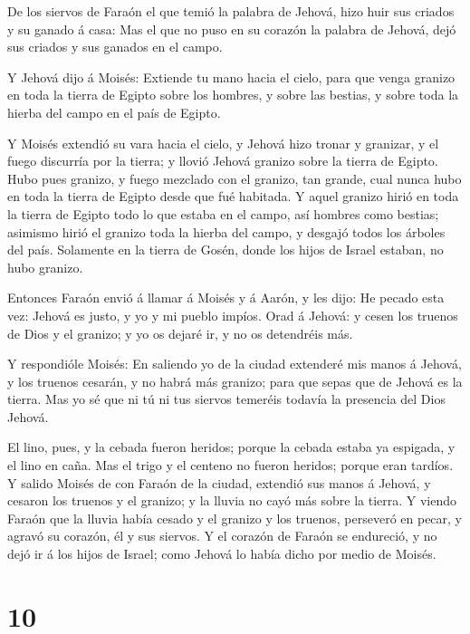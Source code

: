  De los siervos de Faraón el que temió la palabra de
Jehová, hizo huir sus criados y su ganado á casa:  Mas el
que no puso en su corazón la palabra de Jehová, dejó sus criados y sus
ganados en el campo.

 Y Jehová dijo á Moisés: Extiende tu mano hacia el cielo,
para que venga granizo en toda la tierra de Egipto sobre los hombres, y
sobre las bestias, y sobre toda la hierba del campo en el país de
Egipto.

 Y Moisés extendió su vara hacia el cielo, y Jehová hizo
tronar y granizar, y el fuego discurría por la tierra; y llovió Jehová
granizo sobre la tierra de Egipto.  Hubo pues granizo, y
fuego mezclado con el granizo, tan grande, cual nunca hubo en toda la
tierra de Egipto desde que fué habitada.  Y aquel granizo
hirió en toda la tierra de Egipto todo lo que estaba en el campo, así
hombres como bestias; asimismo hirió el granizo toda la hierba del
campo, y desgajó todos los árboles del país.  Solamente en
la tierra de Gosén, donde los hijos de Israel estaban, no hubo granizo.

 Entonces Faraón envió á llamar á Moisés y á Aarón, y les
dijo: He pecado esta vez: Jehová es justo, y yo y mi pueblo impíos.
 Orad á Jehová: y cesen los truenos de Dios y el granizo; y
yo os dejaré ir, y no os detendréis más.

 Y respondióle Moisés: En saliendo yo de la ciudad
extenderé mis manos á Jehová, y los truenos cesarán, y no habrá más
granizo; para que sepas que de Jehová es la tierra.  Mas yo
sé que ni tú ni tus siervos temeréis todavía la presencia del Dios
Jehová.

 El lino, pues, y la cebada fueron heridos; porque la
cebada estaba ya espigada, y el lino en caña.  Mas el trigo
y el centeno no fueron heridos; porque eran tardíos.  Y
salido Moisés de con Faraón de la ciudad, extendió sus manos á Jehová, y
cesaron los truenos y el granizo; y la lluvia no cayó más sobre la
tierra.  Y viendo Faraón que la lluvia había cesado y el
granizo y los truenos, perseveró en pecar, y agravó su corazón, él y sus
siervos.  Y el corazón de Faraón se endureció, y no dejó ir
á los hijos de Israel; como Jehová lo había dicho por medio de Moisés.

\hypertarget{section-9}{%
\section{10}\label{section-9}}

